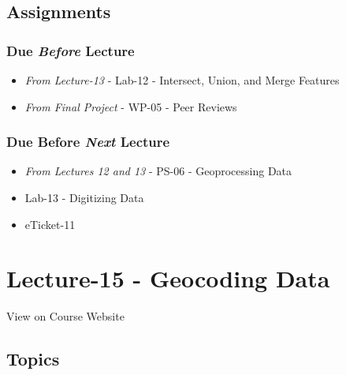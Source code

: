 \documentclass[]{book}
\providecommand{\tightlist}{%
  \setlength{\itemsep}{0pt}\setlength{\parskip}{0pt}}
\begin{document}
\hypertarget{assignments-15}{%
\subsection*{Assignments}\label{assignments-15}}

\hypertarget{due-before-lecture-13}{%
\subsubsection*{\texorpdfstring{Due \emph{Before} Lecture}{Due Before Lecture}}\label{due-before-lecture-13}}

\begin{itemize}
\tightlist
\item
  \emph{From Lecture-13} - Lab-12 - Intersect, Union, and Merge Features
\item
  \emph{From Final Project} - WP-05 - Peer Reviews
\end{itemize}

\hypertarget{due-before-next-lecture-12}{%
\subsubsection*{\texorpdfstring{Due Before \emph{Next} Lecture}{Due Before Next Lecture}}\label{due-before-next-lecture-12}}

\begin{itemize}
\tightlist
\item
  \emph{From Lectures 12 and 13} - PS-06 - Geoprocessing Data
\item
  Lab-13 - Digitizing Data
\item
  eTicket-11
\end{itemize}

\hypertarget{lecture-15---geocoding-data}{%
\section*{Lecture-15 - Geocoding Data}\label{lecture-15---geocoding-data}}

View on Course Website

\hypertarget{topics-15}{%
\subsection*{Topics}\label{topics-15}}
\end{document}
